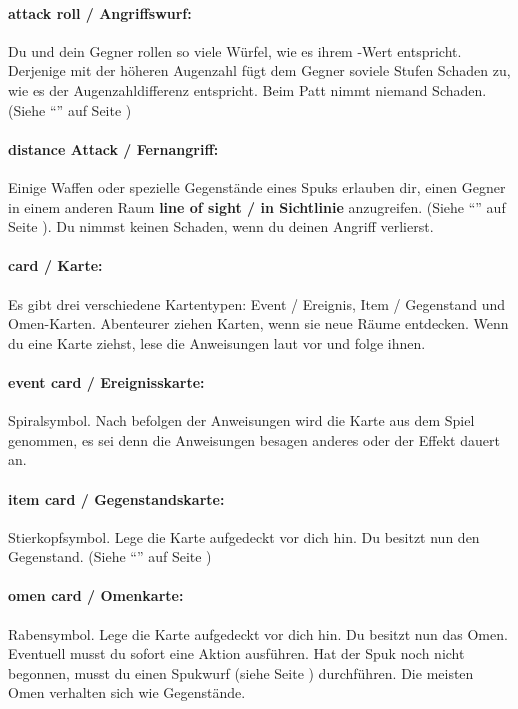 \paragraph{attack roll / Angriffswurf:} Du und dein Gegner rollen so viele Würfel, wie es ihrem \might-Wert entspricht. Derjenige mit der höheren Augenzahl fügt dem Gegner soviele Stufen Schaden zu, wie es der Augenzahldifferenz entspricht. Beim Patt nimmt niemand Schaden. (Siehe ``'' auf Seite \pageref{kap:rule:attack})

\paragraph{distance Attack / Fernangriff:} Einige Waffen oder spezielle Gegenstände eines Spuks erlauben dir, einen Gegner in einem anderen Raum \textbf{line of sight / in Sichtlinie} anzugreifen. (Siehe ``'' auf Seite \pageref{kap:rule:specialattack}). Du nimmst keinen Schaden, wenn du deinen Angriff verlierst.

\paragraph{card / Karte:} Es gibt drei verschiedene Kartentypen: Event / Ereignis, Item / Gegenstand und Omen-Karten. Abenteurer ziehen Karten, wenn sie neue Räume entdecken. Wenn du eine Karte ziehst, lese die Anweisungen laut vor und folge ihnen.

\paragraph{event card / Ereignisskarte:} Spiralsymbol. Nach befolgen der Anweisungen wird die Karte aus dem Spiel genommen, es sei denn die Anweisungen besagen anderes oder der Effekt dauert an.

\paragraph{item card / Gegenstandskarte:} Stierkopfsymbol. Lege die Karte aufgedeckt vor dich hin. Du besitzt nun den Gegenstand.
(Siehe ``'' auf Seite \pageref{kap:rule:useitemomen})

\paragraph{omen card / Omenkarte:} Rabensymbol. Lege die Karte aufgedeckt vor dich hin. Du besitzt nun das Omen. Eventuell musst du sofort eine Aktion ausführen. Hat der Spuk noch nicht begonnen, musst du einen Spukwurf (siehe Seite \pageref{kap:rule:makehauntroll}) durchführen. Die meisten Omen verhalten sich wie Gegenstände.

